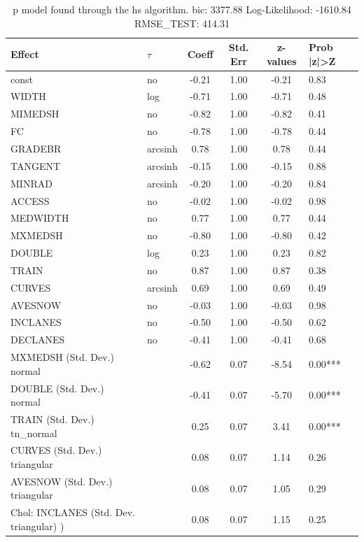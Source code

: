 \begin{table}
	\caption{p model found through the hs algorithm. bic: 3377.88 Log-Likelihood: -1610.84 RMSE_TEST: 414.31}
	\begin{center}
		\begin{tabular}{|l|l|c|c|c|l|}
			\hline
			Effect & $\tau$ & Coeff & Std. Err & z-values & Prob |z|>Z \\
			\hline
			const & no & -0.21 & 1.00 & -0.21 & 0.83 \\
			\hline
			WIDTH & log & -0.71 & 1.00 & -0.71 & 0.48 \\
			\hline
			MIMEDSH & no & -0.82 & 1.00 & -0.82 & 0.41 \\
			\hline
			FC & no & -0.78 & 1.00 & -0.78 & 0.44 \\
			\hline
			GRADEBR & arcsinh & 0.78 & 1.00 & 0.78 & 0.44 \\
			\hline
			TANGENT & arcsinh & -0.15 & 1.00 & -0.15 & 0.88 \\
			\hline
			MINRAD & arcsinh & -0.20 & 1.00 & -0.20 & 0.84 \\
			\hline
			ACCESS & no & -0.02 & 1.00 & -0.02 & 0.98 \\
			\hline
			MEDWIDTH & no & 0.77 & 1.00 & 0.77 & 0.44 \\
			\hline
			MXMEDSH & no & -0.80 & 1.00 & -0.80 & 0.42 \\
			\hline
			DOUBLE & log & 0.23 & 1.00 & 0.23 & 0.82 \\
			\hline
			TRAIN & no & 0.87 & 1.00 & 0.87 & 0.38 \\
			\hline
			CURVES & arcsinh & 0.69 & 1.00 & 0.69 & 0.49 \\
			\hline
			AVESNOW & no & -0.03 & 1.00 & -0.03 & 0.98 \\
			\hline
			INCLANES & no & -0.50 & 1.00 & -0.50 & 0.62 \\
			\hline
			DECLANES & no & -0.41 & 1.00 & -0.41 & 0.68 \\
			\hline
			MXMEDSH (Std. Dev.) normal &  & -0.62 & 0.07 & -8.54 & 0.00*** \\
			\hline
			DOUBLE (Std. Dev.) normal &  & -0.41 & 0.07 & -5.70 & 0.00*** \\
			\hline
			TRAIN (Std. Dev.) tn_normal &  & 0.25 & 0.07 & 3.41 & 0.00*** \\
			\hline
			CURVES (Std. Dev.) triangular &  & 0.08 & 0.07 & 1.14 & 0.26 \\
			\hline
			AVESNOW (Std. Dev.) triangular &  & 0.08 & 0.07 & 1.05 & 0.29 \\
			\hline
			 Chol: INCLANES (Std. Dev. triangular) ) &  & 0.08 & 0.07 & 1.15 & 0.25 \\

\end{tabular}
\end{center}
\end{table}
